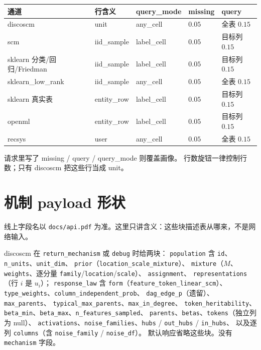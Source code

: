 \documentclass[11pt,a4paper,fontset=none]{ctexart}
\begin{document}
{\small
\begin{center}
\begin{tabular}{@{}lllll@{}}
\toprule
通道 & 行含义 & query\_mode & missing & query \\
\midrule
discoscm & unit & any\_cell & $0.05$ & 全表 $0.15$ \\
scm & iid\_sample & label\_cell & $0.05$ & 目标列 $0.15$ \\
sklearn 分类/回归/Friedman & iid\_sample & label\_cell & $0.05$ & 目标列 $0.15$ \\
sklearn\_low\_rank & iid\_sample & any\_cell & $0.05$ & 全表 $0.15$ \\
sklearn 真实表 & entity\_row & label\_cell & $0.05$ & 目标列 $0.15$ \\
openml & entity\_row & label\_cell & $0.05$ & 目标列 $0.15$ \\
recsys & user & any\_cell & $0.05$ & 全表 $0.15$ \\
\bottomrule
\end{tabular}
\end{center}
}

请求里写了 missing / query / query\_mode 则覆盖画像。
行数旋钮一律控制行数；只有 discoscm 把这些行当成 unit。

\section{机制 payload 形状}
\label{app:payload}

线上字段名以 \texttt{docs/api.pdf} 为准。这里只讲含义：这些块描述表从哪来，不是网络输入。

discoscm 在 \texttt{return\_mechanism} 或 \texttt{debug} 时给两块：
\texttt{population} 含 \texttt{id}、\texttt{n\_units}、\texttt{unit\_dim}、
\texttt{prior}（\texttt{location\_scale\_mixture}）、
\texttt{mixture}（$M$、\texttt{weights}、逐分量 \texttt{family}/\texttt{location}/\texttt{scale}）、
\texttt{assignment}、
\texttt{representations}（行 $i$ 是 $u_i$）；
\texttt{response\_law} 含 \texttt{form}（\texttt{feature\_token\_linear\_scm}）、
\texttt{type\_weights}、\texttt{column\_independent\_prob}、
\texttt{dag\_edge\_p}（遗留）、\texttt{max\_parents}、
\texttt{typical\_max\_parents}、\texttt{max\_in\_degree}、
\texttt{token\_heritability}、
\texttt{beta\_min}、\texttt{beta\_max}、\texttt{n\_features\_sampled}、
\texttt{parents}、\texttt{betas}、\texttt{tokens}（独立列为 null）、
\texttt{activations}、\texttt{noise\_families}、\texttt{hubs} / \texttt{out\_hubs} / \texttt{in\_hubs}、
以及逐列 \texttt{columns}（含 \texttt{noise\_family} / \texttt{noise\_df}）。
默认响应省略这些块。没有 \texttt{mechanism} 字段。
\end{document}

